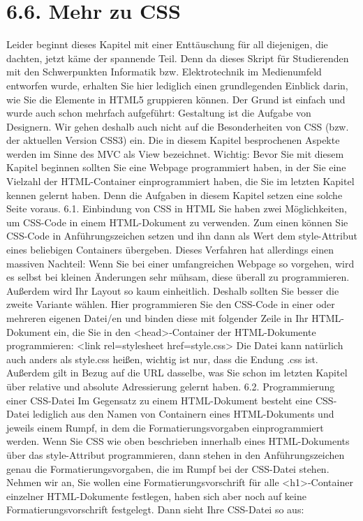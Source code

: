 \section{6.6.	Mehr zu CSS}
Leider beginnt dieses Kapitel mit einer Enttäuschung für all diejenigen, die dachten, jetzt käme der spannende Teil. Denn da dieses Skript für Studierenden mit den Schwerpunkten Informatik bzw. Elektrotechnik im Medienumfeld entworfen wurde, erhalten Sie hier lediglich einen grundlegenden Einblick darin, wie Sie die Elemente in HTML5 gruppieren können. Der Grund ist einfach und wurde auch schon mehrfach aufgeführt: Gestaltung ist die Aufgabe von Designern. Wir gehen deshalb auch nicht auf die Besonderheiten von CSS (bzw. der aktuellen Version CSS3) ein.
Die in diesem Kapitel besprochenen Aspekte werden im Sinne des MVC als View bezeichnet.
Wichtig: Bevor Sie mit diesem Kapitel beginnen sollten Sie eine Webpage programmiert haben, in der Sie eine Vielzahl der HTML-Container einprogrammiert haben, die Sie im letzten Kapitel kennen gelernt haben. Denn die Aufgaben in diesem Kapitel setzen eine solche Seite voraus.
6.1.	Einbindung von CSS in HTML
Sie haben zwei Möglichkeiten, um CSS-Code in einem HTML-Dokument zu verwenden. Zum einen können Sie CSS-Code in Anführungszeichen setzen und ihn dann als Wert dem style-Attribut eines beliebigen Containers übergeben. Dieses Verfahren hat allerdings einen massiven Nachteil: Wenn Sie bei einer umfangreichen Webpage so vorgehen, wird es selbst bei kleinen Änderungen sehr mühsam, diese überall zu programmieren. Außerdem wird Ihr Layout so kaum einheitlich.
Deshalb sollten Sie besser die zweite Variante wählen. Hier programmieren Sie den CSS-Code in einer oder mehreren eigenen Datei/en und binden diese mit folgender Zeile in Ihr HTML-Dokument ein, die Sie in den <head>-Container der HTML-Dokumente programmieren:
<link rel=stylesheet href=style.css>
Die Datei kann natürlich auch anders als style.css heißen, wichtig ist nur, dass die Endung .css ist. Außerdem gilt in Bezug auf die URL dasselbe, was Sie schon im letzten Kapitel über relative und absolute Adressierung gelernt haben.
6.2.	Programmierung einer CSS-Datei
Im Gegensatz zu einem HTML-Dokument besteht eine CSS-Datei lediglich aus den Namen von Containern eines HTML-Dokuments und jeweils einem Rumpf, in dem die Formatierungsvorgaben einprogrammiert werden.
Wenn Sie CSS wie oben beschrieben innerhalb eines HTML-Dokuments über das style-Attribut programmieren, dann stehen in den Anführungszeichen genau die Formatierungsvorgaben, die im Rumpf bei der CSS-Datei stehen.
Nehmen wir an, Sie wollen eine Formatierungsvorschrift für alle <h1>-Container einzelner HTML-Dokumente festlegen, haben sich aber noch auf keine Formatierungsvorschrift festgelegt. Dann sieht Ihre CSS-Datei so aus:
